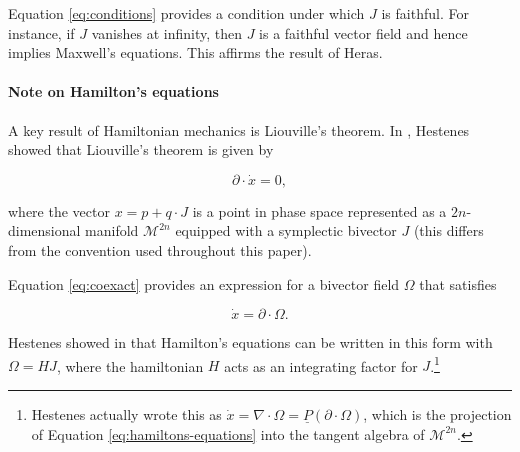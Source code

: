 \documentclass[twocolumn]{article}
\begin{document}
Equation \ref{eq:conditions} provides a condition under which $J$ is faithful. For instance, if $J$ vanishes at infinity, then $J$ is a faithful vector field and hence implies Maxwell's equations. This affirms the result of Heras.\cite{heras}

\paragraph{Note on Hamilton's equations}

A key result of Hamiltonian mechanics is Liouville's theorem. In \cite{hestenes-hamilton}, Hestenes showed that Liouville's theorem is given by

\begin{equation}
  \partial \cdot \dot x = 0,\label{eq:hamilton-continuity}
\end{equation}

where the vector $x = p + q \cdot J$ is a point in phase space represented as a $2n$-dimensional manifold $\mathcal{M}^{2n}$ equipped with a symplectic bivector $J$ (this differs from the convention used throughout this paper).

Equation \ref{eq:coexact} provides an expression for a bivector field $\Omega$ that satisfies

\begin{equation}
  \dot x = \partial \cdot \Omega. \label{eq:hamiltons-equations}
\end{equation}

Hestenes showed in \cite{hestenes-hamilton} that Hamilton's equations can be written in this form with $\Omega = H J$, where the hamiltonian $H$ acts as an integrating factor for $J$.\footnote{Hestenes actually wrote this as $\dot x = \nabla \cdot \Omega = \underline P (\partial \cdot \Omega)$, which is the projection of Equation \ref{eq:hamiltons-equations} into the tangent algebra of $\mathcal{M}^{2n}$.}


\end{document}
